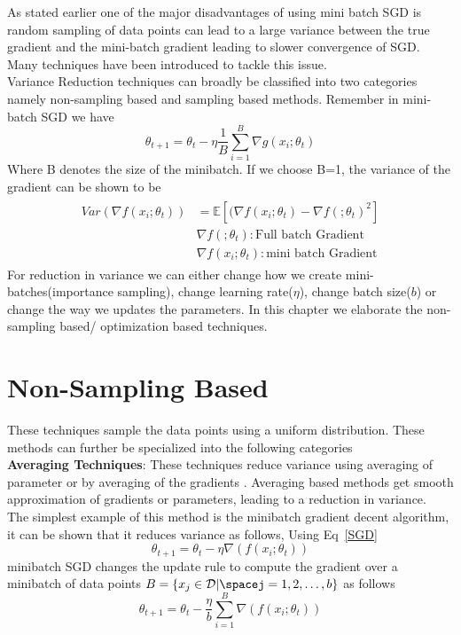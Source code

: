 \documentclass[a4paper,twoside]{iiththesis}
\theoremstyle{definition}
\theoremstyle{definition}
\theoremstyle{remark}
\begin{document}
As stated earlier one of the major disadvantages of using mini batch SGD is random sampling of data points can lead to a large variance between the true gradient and the mini-batch gradient leading to slower convergence of SGD. Many techniques have been introduced to tackle this issue. 
\\
Variance Reduction techniques can broadly be classified into two categories namely non-sampling based and sampling based methods. Remember in mini-batch SGD we have 
\begin{equation}
\theta_{t+1} = \theta_t - \eta \frac{1}{B}\sum_{i=1}^B \nabla g(x_i; \theta_t )
\end{equation}
Where B denotes the size of the minibatch. If we choose B=1, the variance of the gradient can be shown to be 
\begin{align}\label{var-red}
\begin{split}
	Var(\nabla f(x_i; \theta_t)) &= \mathbb{E}[(\nabla f(x_i; \theta_t) -\nabla f( ; \theta_t)^2]\\
    &\nabla f(; \theta_t): \text{Full batch Gradient} \\
    &\nabla f(x_i; \theta_t): \text{mini batch Gradient}
\end{split}
\end{align}
For reduction in variance we can either change how we create mini-batches(importance sampling), change learning rate($\eta$), change batch size($b$) or change the way we updates the parameters. In this chapter we elaborate the non-sampling based/ optimization based techniques. 

\section{Non-Sampling Based}
These techniques sample the data points using a uniform distribution. These methods can further be specialized into the following categories \\
\textbf{Averaging Techniques}: These techniques reduce variance using averaging of parameter \cite{polyak1992acceleration} or by averaging of the gradients \cite{nesterov2013introductory}. Averaging based methods get smooth approximation of gradients or parameters, leading to a reduction in variance. 
\\
The simplest example of this method is the minibatch gradient decent algorithm, it can be shown that it reduces variance as follows,
Using Eq~\ref{SGD}
\begin{equation}
\theta_{t+1} = \theta_{t} - \eta \nabla(f(x_i; \theta_t)) 
\end{equation}
minibatch SGD changes the update rule to compute the gradient over a minibatch of data points $B = \{x_j \in \mathcal{D}\space|\spacej={1, 2, \ldots, b}\}$ as follows 
\begin{equation} \label{MSGD}
\theta_{t+1} = \theta_{t} - \frac{\eta}{b} \sum_{i=1}^B \nabla(f(x_i; \theta_t))  
\end{equation}
\end{document}
